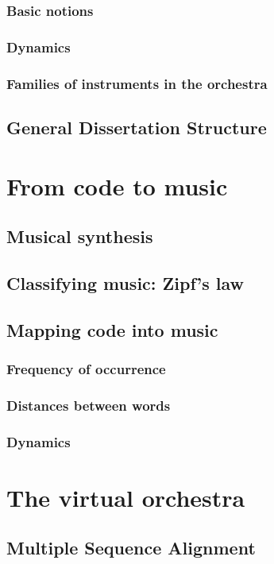 \documentclass[11pt,twoside,a4paper]{report}
\begin{document}
\subsection{Basic notions}
\subsection{Dynamics}
\subsection{Families of instruments in the orchestra}


\section{General Dissertation Structure}


\chapter{From code to music}
\section{Musical synthesis}
\section{Classifying music: Zipf's law}
\section{Mapping code into music}
\subsection{Frequency of occurrence}
\subsection{Distances between words}
\subsection{Dynamics}

\chapter{The virtual orchestra}
\section{Multiple Sequence Alignment}
\end{document}

